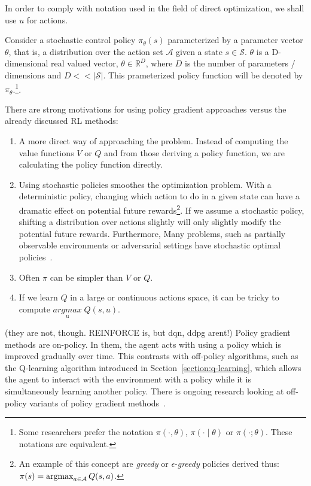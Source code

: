 \documentclass{../main.tex}{subfiles}
\begin{document}

In order to comply with notation used in the field of direct optimization, we shall use $u$ for actions.

Consider a stochastic control policy  $\pi_{\theta}(s)$ parameterized by a parameter vector $\theta$, that is, a distribution over the action set $\mathcal{A}$ given a state $s \in \mathcal{S}$. $\theta$ is a D-dimensional real valued vector,  $\theta \in \mathbb{R}^{D}$, where $D$ is the number of parameters / dimensions and $D << |\mathcal{S}|$. This prameterized policy function will be denoted by $\pi_{\theta}$.\footnote{Some researchers prefer the notation $\pi(\cdot, \theta)$, $\pi(\cdot \mid \theta)$ or $\pi(\cdot; \theta)$. These notations are equivalent.}. 

There are strong motivations for using policy gradient approaches versus the already discussed RL methods:
\begin{enumerate}
\item A more direct way of approaching the problem. Instead of computing the value functions $V$ or $Q$ and from those deriving a policy function, we are calculating the policy function directly.
\item Using stochastic policies smoothes the optimization problem. With a deterministic policy, changing which action to do in a given state can have a dramatic effect on potential future rewards\footnote{An example of this concept are \textit{greedy} or $\epsilon$-\textit{greedy} policies derived thus: $\pi(s) = \operatorname*{argmax}_{a \in \mathcal{A}} Q(s,a)$.}. If we assume a stochastic policy, shifting a distribution over actions slightly will only slightly modify the potential future rewards. Furthermore, Many problems, such as partially observable environments or adversarial settings have stochastic optimal policies~\citep{Degris2012}.
\item Often $\pi$ can be simpler than $V$ or $Q$.
\item If we learn $Q$ in a large or continuous actions space, it can be tricky to compute $\underset{\text{u}}{argmax}\; Q(s,u)$.
\end{enumerate}
 
(they are not, though. REINFORCE is, but dqn, ddpg arent!) Policy gradient methods are on-policy. In them, the agent acts with using a policy which is improved gradually over time. This contrasts with off-policy algorithms, such as the Q-learning algorithm introduced in Section~\ref{section:q-learning}, which allows the agent to interact with the environment with a policy while it is simultaneously learning another policy. There is ongoing research looking at off-policy variants of policy gradient methods~\citep{Mnih2013, Mnih2016}. 
\end{document}
